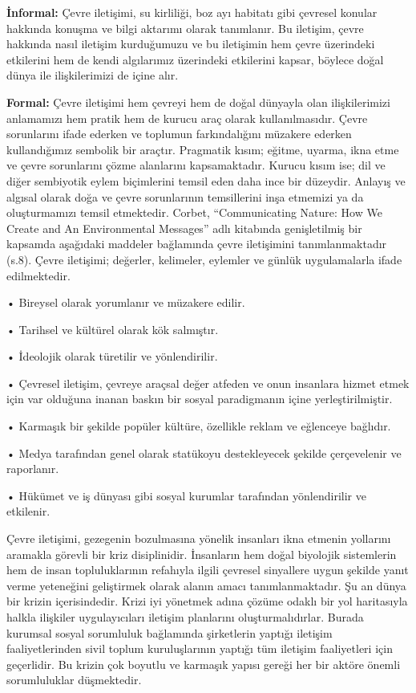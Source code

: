 \documentclass[
]{book}
\begin{document}
\textbf{İnformal:} Çevre iletişimi, su kirliliği, boz ayı habitatı gibi çevresel konular hakkında konuşma ve bilgi aktarımı olarak tanımlanır. Bu iletişim, çevre hakkında nasıl iletişim kurduğumuzu ve bu iletişimin hem çevre üzerindeki etkilerini hem de kendi algılarımız üzerindeki etkilerini kapsar, böylece doğal dünya ile ilişkilerimizi de içine alır.

\textbf{Formal:} Çevre iletişimi hem çevreyi hem de doğal dünyayla olan ilişkilerimizi anlamamızı hem pratik hem de kurucu araç olarak kullanılmasıdır. Çevre sorunlarını ifade ederken ve toplumun farkındalığını müzakere ederken kullandığımız sembolik bir araçtır. Pragmatik kısım; eğitme, uyarma, ikna etme ve çevre sorunlarını çözme alanlarını kapsamaktadır. Kurucu kısım ise; dil ve diğer sembiyotik eylem biçimlerini temsil eden daha ince bir düzeydir. Anlayış ve algısal olarak doğa ve çevre sorunlarının temsillerini inşa etmemizi ya da oluşturmamızı temsil etmektedir.
Corbet, ``Communicating Nature: How We Create and An Environmental Messages'' adlı kitabında genişletilmiş bir kapsamda aşağıdaki maddeler bağlamında çevre iletişimini tanımlanmaktadır (s.8). \citep{corbett2006} Çevre iletişimi; değerler, kelimeler, eylemler ve günlük uygulamalarla ifade edilmektedir.

• Bireysel olarak yorumlanır ve müzakere edilir.

• Tarihsel ve kültürel olarak kök salmıştır.

• İdeolojik olarak türetilir ve yönlendirilir.

• Çevresel iletişim, çevreye araçsal değer atfeden ve onun insanlara hizmet etmek için var olduğuna inanan baskın bir sosyal paradigmanın içine yerleştirilmiştir.

• Karmaşık bir şekilde popüler kültüre, özellikle reklam ve eğlenceye bağlıdır.

• Medya tarafından genel olarak statükoyu destekleyecek şekilde çerçevelenir ve raporlanır.

• Hükümet ve iş dünyası gibi sosyal kurumlar tarafından yönlendirilir ve etkilenir.

Çevre iletişimi, gezegenin bozulmasına yönelik insanları ikna etmenin yollarını aramakla görevli bir kriz disiplinidir. İnsanların hem doğal biyolojik sistemlerin hem de insan topluluklarının refahıyla ilgili çevresel sinyallere uygun şekilde yanıt verme yeteneğini geliştirmek olarak alanın amacı tanımlanmaktadır. Şu an dünya bir krizin içerisindedir. Krizi iyi yönetmek adına çözüme odaklı bir yol haritasıyla halkla ilişkiler uygulayıcıları iletişim planlarını oluşturmalıdırlar. Burada kurumsal sosyal sorumluluk bağlamında şirketlerin yaptığı iletişim faaliyetlerinden sivil toplum kuruluşlarının yaptığı tüm iletişim faaliyetleri için geçerlidir. Bu krizin çok boyutlu ve karmaşık yapısı gereği her bir aktöre önemli sorumluluklar düşmektedir.
\end{document}
